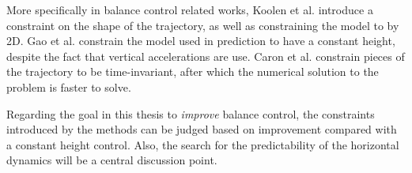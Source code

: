 More specifically in balance control related works,  Koolen et al. introduce a constraint on the shape of the trajectory, as well as constraining the model to by \ac{2D}. Gao et al. constrain the model used in prediction to have a constant height, despite the fact that vertical accelerations are use. Caron et al. constrain pieces of the trajectory to be time-invariant, after which the numerical solution to the problem is faster to solve.

Regarding the goal in this thesis to \textit{improve} balance control, the constraints introduced by the methods can be judged based on improvement compared with a constant height control. Also, the search for the predictability of the horizontal dynamics will be a central discussion point.